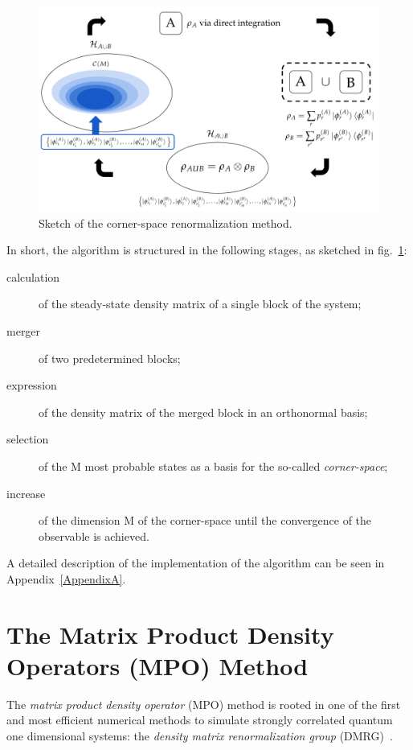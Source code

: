 \begin{figure}
    \centering
    \includegraphics[scale=0.55]{Figures/csr_sketch}
    \captionsetup{width=1.\linewidth}
    \caption{Sketch of the corner-space renormalization method.}
    \label{fig:csr_sketch}
\end{figure}

\bigskip
In short, the algorithm is structured in the following stages, as sketched in fig.~\ref{fig:csr_sketch}:
\begin{description}
    \item[calculation] of the steady-state density matrix of a single block of the system;
    \item[merger] of two predetermined blocks;
    \item[expression] of the density matrix of the merged block in an orthonormal basis;
    \item[selection] of the M most probable states as a basis for the so-called \emph{corner-space};
    \item[increase] of the dimension M of the corner-space until the convergence of the observable is achieved.
\end{description}

A detailed description of the implementation of the algorithm can be seen in Appendix~\ref{AppendixA}.


\section{The Matrix Product Density Operators (MPO) Method}
\label{chap_numMethods_MPO}
The \emph{matrix product density operator} (MPO) method is rooted in one of the first and most efficient numerical methods to simulate strongly correlated quantum one dimensional systems: the \emph{density matrix renormalization group} (DMRG)~\cite{s_white:dmrg, PhysRevB.48.10345, RevModPhys.77.259}.

